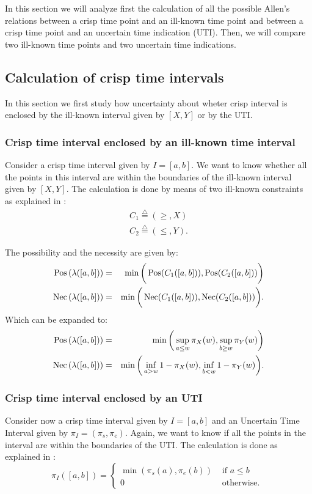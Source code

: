 In this section we will analyze first the calculation of all the possible Allen's relations between a crisp time point and an ill-known time point and between a crisp time point and an uncertain time indication (UTI). Then, we will compare two ill-known time points and two uncertain time indications.

\subsection{\label{subsec:prop-crisp-vs-ill}Calculation of crisp time intervals}
In this section we first study how uncertainty about wheter crisp interval is enclosed by the ill-known interval given by $[X,Y]$ or by the UTI.

\subsubsection{Crisp time interval enclosed by an ill-known time interval}
Consider a crisp time interval given by $I=[a, b]$. We want to know whether all the points in this interval are within the boundaries of the ill-known interval given by $[X, Y]$. The calculation is done by means of two ill-known constraints as explained in \cite{}:
\begin{eqnarray}
C_1\stackrel{\triangle}{=}\left(\geq,X\right)\\
C_2\stackrel{\triangle}{=}\left(\leq,Y\right).
\end{eqnarray}

The possibility and the necessity are given by:
\begin{eqnarray}
\operatorname{Pos}\left(\lambda([a,b])\right)&=&\min\bigg(\operatorname{Pos}(C_1([a,b])),\operatorname{Pos}(C_2([a,b]))\bigg)\\
\operatorname{Nec}\left(\lambda([a,b])\right)&=&\min\bigg(\operatorname{Nec}(C_1([a,b])),\operatorname{Nec}(C_2([a,b]))\bigg).
\end{eqnarray}
Which can be expanded to:
\begin{eqnarray}
\label{eq:interval-pos}
\operatorname{Pos}\left(\lambda([a,b])\right)&=&\min\bigg(\sup_{a\leq w}\pi_{X}(w),\sup_{b\geq w}\pi_{Y}(w)\bigg)\\
\label{eq:interval-nec}
\operatorname{Nec}\left(\lambda([a,b])\right)&=&\min\bigg(\inf_{a>w}1-\pi_{X}(w),\inf_{b<w}1-\pi_{Y}(w)\bigg).
\end{eqnarray}


\subsubsection{\label{subsubsec:crisp-uti}Crisp time interval enclosed by an UTI}
Consider now a crisp time interval given by $I=[a, b]$ and an Uncertain Time Interval given by $\pi_I = \left(\pi_s, \pi_e \right)$. Again, we want to know if all the points in the interval are within the boundaries of the UTI. The calculation is done as explained in \cite{}:
\begin{equation}
 \pi_I \left( \left[a, b  \right] \right) =
\begin{cases}
 \min \left(\pi_s(a),\pi_e(b)\right) & \mbox{ if } a \leq b\\
0 				     & \mbox{ otherwise. }
\end{cases}
\end{equation}

